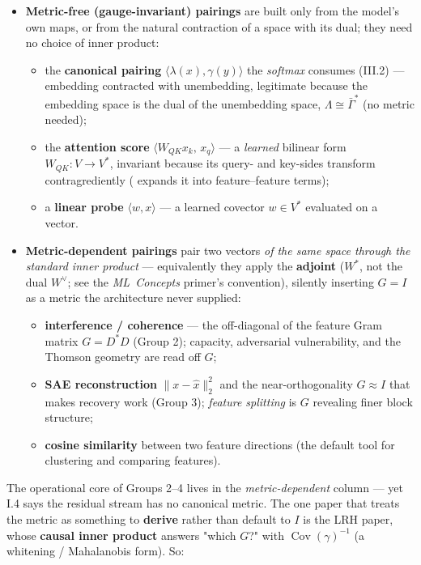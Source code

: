 \begin{itemize}
\item \textbf{Metric-free (gauge-invariant) pairings} are built only from the model's own maps, or from the natural contraction of a space with its dual; they need no choice of inner product:
\begin{itemize}
\item the \textbf{canonical pairing} $\langle\lambda(x),\gamma(y)\rangle$ the \emph{softmax} consumes (III.2) --- embedding contracted with unembedding, legitimate because the embedding space is the dual of the unembedding space, $\Lambda\cong\bar\Gamma^{*}$ (no metric needed);
\item the \textbf{attention score} $\langle W_{QK}x_k,\, x_q\rangle$ --- a \emph{learned} bilinear form $W_{QK}:V\to V^{*}$, invariant because its query- and key-sides transform contragrediently (\textcite{tracing-attention-feature-interactions} expands it into feature--feature terms);
\item a \textbf{linear probe} $\langle w,x\rangle$ --- a learned covector $w\in V^{*}$ evaluated on a vector.
\end{itemize}
\item \textbf{Metric-dependent pairings} pair two vectors \emph{of the same space through the standard inner product} --- equivalently they apply the \textbf{adjoint} ($W^{*}$, not the dual $W^{\vee}$; see the \emph{ML~Concepts} primer's convention), silently inserting $G=I$ as a metric the architecture never supplied:
\begin{itemize}
\item \textbf{interference / coherence} --- the off-diagonal of the feature Gram matrix $G=D^{*}D$ (Group 2); capacity, adversarial vulnerability, and the Thomson geometry are read off $G$;
\item \textbf{SAE reconstruction} $\|x-\hat x\|_2^2$ and the near-orthogonality $G\approx I$ that makes recovery work (Group 3); \emph{feature splitting} is $G$ revealing finer block structure;
\item \textbf{cosine similarity} between two feature directions (the default tool for clustering and comparing features).
\end{itemize}
\end{itemize}

The operational core of Groups 2--4 lives in the \emph{metric-dependent} column --- yet I.4 says the residual stream has no canonical metric. The one paper that treats the metric as something to \textbf{derive} rather than default to $I$ is the LRH paper, whose \textbf{causal inner product} answers "which $G$?" with $\operatorname{Cov}(\gamma)^{-1}$ (a whitening / Mahalanobis form). So:


